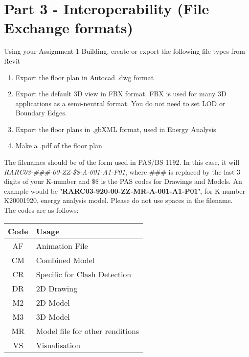 \newpage

\section*{Part 3 - Interoperability (File Exchange formats)}

Using your Assignment 1 Building, create or export the following file types from Revit
\begin{enumerate}
	\item Export the floor plan in Autocad .dwg format
	\item Export the default 3D view in FBX format.  FBX is used for many 3D applications as a semi-neutral format.  You do not need to set LOD or Boundary Edges.
	\item Export the floor plans in .gbXML format, used in Energy Analysis
	\item Make a .pdf of the floor plan
\end{enumerate}
The filenames should be of the form used in PAS/BS 1192.  In this case, it will \textit{RARC03-\#\#\#-00-ZZ-\$\$-A-001-A1-P01}, where \#\#\# is replaced by the last 3 digits of your K-number and \$\$ is the PAS codes for Drawings and Models. An example would be \textbf{'RARC03-920-00-ZZ-MR-A-001-A1-P01'}, for K-number K20001920, energy analysis model.  Please do not use spaces in the filename.\\ The codes are as follows: \\

\begin{tabularx}{\textwidth}{ |c|X| }
	\hline
	\textbf{Code} & \textbf{Usage} \\
	\hline 
	AF  & Animation File  \\
	CM  & Combined Model  \\
	CR  & Specific for Clash Detection  \\
	DR  & 2D Drawing  \\
	M2  & 2D Model  \\
	M3  & 3D Model  \\
	MR  & Model file for other renditions  \\
	VS  & Visualisation  \\
	\hline
\end{tabularx}


